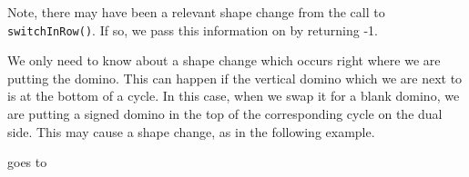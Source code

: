 \documentclass[12pt]{article}
\numberwithin{equation}{section}
\newcommand{\horizontalDominoMaybe}[3]{\filldraw [dominoMaybeStyle] (#2 - 1 + \eps, #1 - 1 + \eps) rectangle + (2 - \teps, 1 -\teps) node [dominoText] {$#3$};}
\newcommand{\verticalDominoMaybe}[3]{\filldraw [dominoMaybeStyle] (#2 - 1 + \eps,  #1 - 1 + \eps) rectangle + (1 - \teps,2 -\teps) node [dominoText] {$#3$};}
\newcommand{\verticalDominoMaybeShift}[4]{\filldraw [dominoMaybeStyle] (#2 - 1 + #4 + \eps,  #1 - 1 + \eps) rectangle + (1 - \teps,2 -\teps) node [dominoText] {$#3$};}
\begin{document}
\begin{itemize}
\begin{itemize}
\begin{figure}[H]
      \end{figure}
      Note, there may have been a relevant shape change from the call to \texttt{switchInRow()}.
      If so, we pass this information on by returning -1.

      We only need to know about a shape change which occurs right where we are putting the domino.
      This can happen if the vertical domino which we are next to is at the bottom of a cycle.
      In this case, when we swap it for a blank domino, we are putting a signed domino in the top of the corresponding cycle on the dual side.
      This may cause a shape change, as in the following example.
      \begin{figure}[H]
        \centering
      \end{figure}
      goes to
      \begin{figure}[H]
        \centering
\end{figure}
\end{itemize}
\end{itemize}
\end{document}
